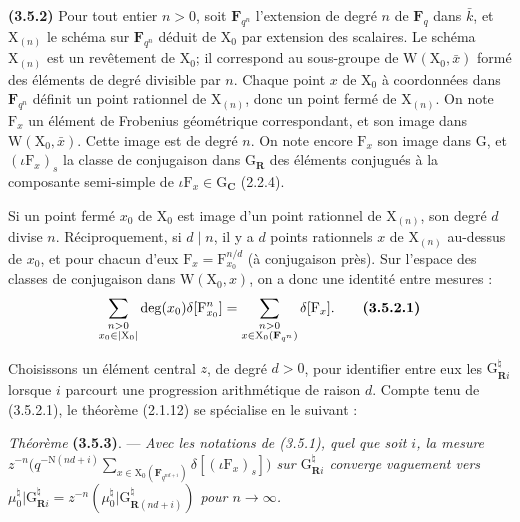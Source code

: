 \documentclass[11pt,leqno]{article}
\begin{document}
\textbf{(3.5.2)} Pour tout entier \(n>0\), soit \(\mathbf F_{q^n}\) l’extension de degré \(n\) de \(\mathbf F_q\) dans \(\bar k\), et \(\mathrm X_{(n)}\) le schéma sur \(\mathbf F_{q^n}\) déduit de \(\mathrm X_0\) par extension des scalaires. Le schéma \(\mathrm X_{(n)}\) est un revêtement de \(\mathrm X_0\); il correspond au sous-groupe de \(\mathrm W(\mathrm X_0,\bar x)\) formé des éléments de degré divisible par \(n\). Chaque point \(x\) de \(\mathrm X_0\) à coordonnées dans \(\mathbf F_{q^n}\) définit un point rationnel de \(\mathrm X_{(n)}\), donc un point fermé de \(\mathrm X_{(n)}\). On note \(\mathrm F_x\) un élément de Frobenius géométrique correspondant, et son image dans \(\mathrm W(\mathrm X_0,\bar x)\). Cette image est de degré \(n\). On note encore \(\mathrm F_x\) son image dans \(\mathrm G\), et \((\iota\mathrm F_x)_s\) la classe de conjugaison dans \(\mathrm G_{\mathbf R}\) des éléments conjugués à la composante semi-simple de \(\iota\mathrm F_x\in\mathrm G_{\mathbf C}\) (2.2.4).

Si un point fermé \(x_0\) de \(\mathrm X_0\) est image d’un point rationnel de \(\mathrm X_{(n)}\), son degré \(d\) divise \(n\). Réciproquement, si \(d\mid n\), il y a \(d\) points rationnels \(x\) de \(\mathrm X_{(n)}\) au-dessus de \(x_0\), et pour chacun d’eux \(\mathrm F_x=\mathrm F_{x_0}^{n/d}\) (à conjugaison près). Sur l’espace des classes de conjugaison dans \(\mathrm W(\mathrm X_0,x)\), on a donc une identité entre mesures :
\[
\sum_{\substack{n>0\\x_0\in|\mathrm X_0|}}
\deg(x_0)\delta[\mathrm F_{x_0}^{n}]
=
\sum_{\substack{n>0\\x\in\mathrm X_0(\mathbf F_{q^n})}}
\delta[\mathrm F_x].
\tag*{\textbf{(3.5.2.1)}}
\]

Choisissons un élément central \(z\), de degré \(d>0\), pour identifier entre eux les \(\mathrm G_{\mathbf R i}^{\natural}\) lorsque \(i\) parcourt une progression arithmétique de raison \(d\). Compte tenu de (3.5.2.1), le théorème (2.1.12) se spécialise en le suivant :

\textit{Théorème} \textbf{(3.5.3)}. — \textit{Avec les notations de (3.5.1), quel que soit \(i\), la mesure \(\displaystyle z^{-n}\bigl(q^{-\mathrm N(nd+i)}\sum_{x\in\mathrm X_0(\mathbf F_{q^{nd+i}})}\delta[(\iota\mathrm F_x)_s]\bigr)\) sur \(\mathrm G_{\mathbf R i}^{\natural}\) converge vaguement vers \(\mu_0^{\natural}\vert\mathrm G_{\mathbf R i}^{\natural}=z^{-n}(\mu_0^{\natural}\vert\mathrm G_{\mathbf R(nd+i)}^{\natural})\) pour \(n\to\infty\).}
\end{document}
